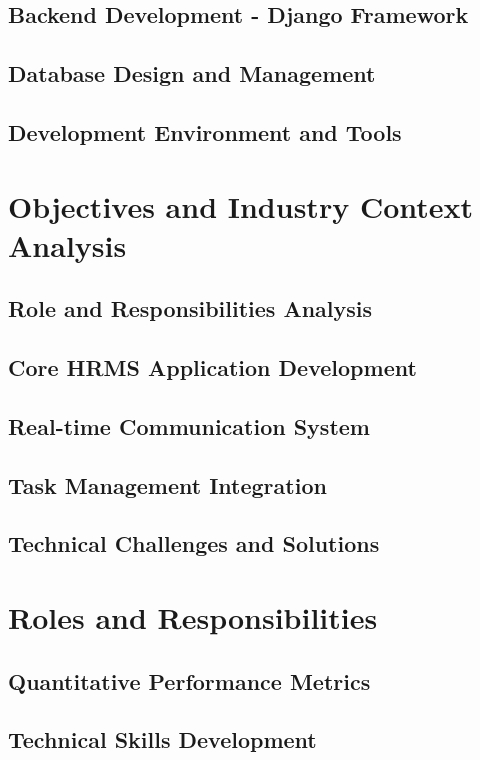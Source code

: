 \documentclass[a4paper, 11pt, oneside]{report}
\begin{document}
\section{Backend Development - Django Framework}
\section{Database Design and Management}
\section{Development Environment and Tools}


\chapter{Objectives and Industry Context Analysis}
\section{Role and Responsibilities Analysis}
\section{Core HRMS Application Development}
\section{Real-time Communication System}
\section{Task Management Integration}
\section{Technical Challenges and Solutions}


\chapter{Roles and Responsibilities}
\section{Quantitative Performance Metrics}
\section{Technical Skills Development}
\end{document}
